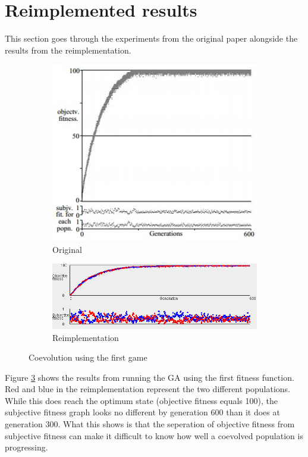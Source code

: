 \documentclass{article}
\begin{document}
\section{Reimplemented results}

This section goes through the experiments from the original paper alongside the results from the reimplementation. 

\begin{figure}
\centering
\begin{subfigure}{.5\textwidth}
  \centering
  \includegraphics[width=.8\linewidth]{Screencaps/OneDimensionOrig}
  \caption{Original}
  \label{fig:eq1orig}
\end{subfigure}%
\begin{subfigure}{.5\textwidth}
  \centering
  \includegraphics[width=\linewidth]{Screencaps/OneDimensionReimp}
  \caption{Reimplementation}
  \label{fig:eq1reimp}
\end{subfigure}
\caption{Coevolution using the first game}
\label{fig:eq1}
\end{figure}

Figure \ref{fig:eq1} shows the results from running the GA using the first fitness function. Red and blue in the reimplementation represent the two different populations. While this does reach the optimum state (objective fitness equals 100), the subjective fitness graph looks no different by generation 600 than it does at generation 300. What this shows is that the seperation of objective fitness from subjective fitness can make it difficult to know how well a coevolved population is progressing.
\end{document}
